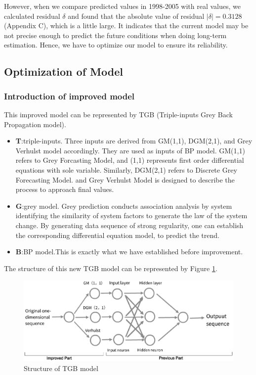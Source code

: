 However, when we compare predicted values in 1998-2005 with real values, we calculated residual $\delta$ and found that the absolute value of residual $|\delta|=0.3128$ (Appendix C), which is a little large. It indicates that the current model may be not precise enough to predict the future conditions when doing long-term estimation. Hence, we have to optimize our model to ensure its reliability.

\subsection{Optimization of Model}
\subsubsection{Introduction of improved model}

This improved model can be represented by TGB (Triple-inputs Grey Back Propagation model).
\begin{itemize}
\item \textbf{T}:triple-inputs. Three inputs are derived from GM(1,1), DGM(2,1), and Grey Verhulst model\cite{Jianyong Liu} accordingly. They are used as inputs of BP model. GM(1,1) refers to Grey Forcasting Model, and (1,1) represents first order differential equations with sole variable. Similarly, DGM(2,1) refers to Discrete Grey Forecasting  Model. and Grey Verhulst Model is designed to describe the process to approach final values.
\item \textbf{G}:grey model. Grey prediction conducts association analysis by system identifying the similarity of system factors to generate the law of the system change. By generating data sequence of strong regularity, one can establish the corresponding differential equation model, to predict the trend.
\item \textbf{B}:BP model.This is exactly what we have established before improvement.
\end{itemize}

The structure of this new TGB model\cite{Shitang Ke} can be represented by Figure \ref{TGB}.
\begin{figure}[hp]
\small
\centering
\includegraphics[width=14cm]{./picture/TGB.eps}
\caption{Structure of TGB model} \label{TGB}
\end{figure}

